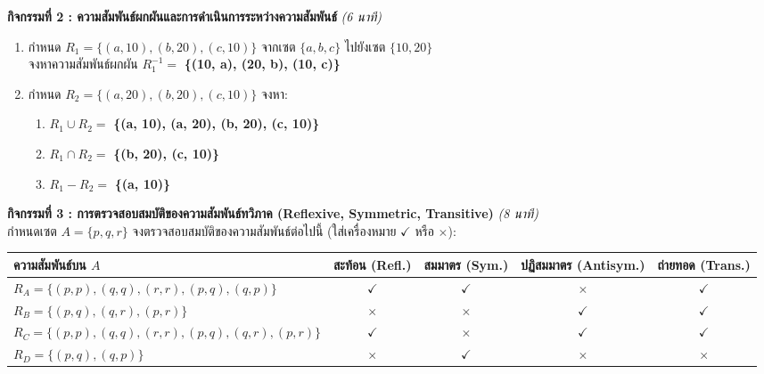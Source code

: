 \documentclass[a4paper,12pt]{article}
\newcommand{\ans}[1]{\textbf{\color{ans}#1}}
\renewcommand{\arraystretch}{1.15}
\begin{document}
\noindent\textbf{กิจกรรมที่ 2 : ความสัมพันธ์ผกผันและการดำเนินการระหว่างความสัมพันธ์} \hfill \textit{(6 นาที)}
\begin{enumerate}[label=\arabic*)]
  \item กำหนด $R_1 = \{(a, 10), (b, 20), (c, 10)\}$ จากเซต $\{a, b, c\}$ ไปยังเซต $\{10, 20\}$\\
        จงหาความสัมพันธ์ผกผัน $R_1^{-1} = $ \ans{\{(10, a), (20, b), (10, c)\}}
  \item กำหนด $R_2 = \{(a, 20), (b, 20), (c, 10)\}$ จงหา:
        \begin{enumerate}[label=(\alph*),itemsep=2pt]
          \item $R_1 \cup R_2 =$ \ans{\{(a, 10), (a, 20), (b, 20), (c, 10)\}}
          \item $R_1 \cap R_2 =$ \ans{\{(b, 20), (c, 10)\}}
          \item $R_1 - R_2 =$ \ans{\{(a, 10)\}}
        \end{enumerate}
\end{enumerate}
\vspace{0.6em}

\noindent\textbf{กิจกรรมที่ 3 : การตรวจสอบสมบัติของความสัมพันธ์ทวิภาค (Reflexive, Symmetric, Transitive)} \hfill \textit{(8 นาที)}\\
กำหนดเซต $A = \{p, q, r\}$ จงตรวจสอบสมบัติของความสัมพันธ์ต่อไปนี้ (ใส่เครื่องหมาย $\checkmark$ หรือ $\times$):
\begin{center}
\renewcommand{\arraystretch}{1.3}
\small
\begin{tabular}{|l|c|c|c|c|}
\hline
\textbf{ความสัมพันธ์บน $A$} & \textbf{สะท้อน (Refl.)} & \textbf{สมมาตร (Sym.)} & \textbf{ปฏิสมมาตร (Antisym.)} & \textbf{ถ่ายทอด (Trans.)} \\ \hline
$R_A = \{(p,p), (q,q), (r,r), (p,q), (q,p)\}$ & \ans{$\checkmark$} & \ans{$\checkmark$} & \ans{$\times$} & \ans{$\checkmark$} \\ \hline
$R_B = \{(p,q), (q,r), (p,r)\}$ & \ans{$\times$} & \ans{$\times$} & \ans{$\checkmark$} & \ans{$\checkmark$} \\ \hline
$R_C = \{(p,p), (q,q), (r,r), (p,q), (q,r), (p,r)\}$ & \ans{$\checkmark$} & \ans{$\times$} & \ans{$\checkmark$} & \ans{$\checkmark$} \\ \hline
$R_D = \{(p,q), (q,p)\}$ & \ans{$\times$} & \ans{$\checkmark$} & \ans{$\times$} & \ans{$\times$} \\ \hline
\end{tabular}
\end{center}
\end{document}
